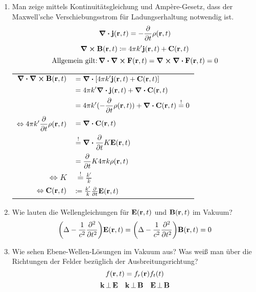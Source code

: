 \documentclass{scrartcl}
\newcommand{\ds}{\displaystyle}
\begin{document}
\begin{enumerate}
    \item Man zeige mittels Kontinuitätsgleichung und Ampère-Gesetz, 
          dass der Maxwell'sche Verschiebungsstrom für Ladungserhaltung
          notwendig ist.
          $$\div \vb j(\vb r, t) = -\pdv{t}\rho(\vb r ,t)$$
          $$\curl\vb B(\vb r, t) \coloneqq 
          4\pi k'\vb j(\vb r ,t) + \vb C(\vb r, t)$$
          $$\text{Allgemein gilt:}\,\div\curl\vb F(\vb r, t)
          =\curl \div \vb F(\vb r, t)=0$$
          \begin{center}
            \begin{tabular}{rl}
            $\ds \div\curl\vb B(\vb r, t)$
                        &$\ds= \div \qty[
                        4\pi k'\vb j(\vb r, t)+\vb C(\vb r, t)]$\\
                        &$\ds= 4\pi k'\div\vb j(\vb r,t) +
                        \div \vb C(\vb r,t)$\\
                        &$\ds= 4\pi k'(-\pdv{t}\rho(\vb r, t)) 
                        +\div \vb C(\vb r,t)\stackrel{!}{=}0$\\
            $\Leftrightarrow\ds 4\pi k'\pdv{t}\rho(\vb r, t)$ 
                        &$\ds =\div \vb 
                        C(\vb r, t)$\footnotemark\\
                        &$\ds \stackrel{!}{=}\div \pdv{t}K\vb E(\vb r, t)$\\
                        &$\ds =\ds \pdv{t} 
                        K4\pi k \rho(\vb r, t)$\\
            $\Leftrightarrow K$         
                        &$\stackrel{!}{=}\frac{k'}{k}$\\
            $\Leftrightarrow \vb C(\vb r,t)$
                        &$\coloneqq \frac{k'}{k}\pdv{t}\vb E(\vb r, t)$
            \end{tabular}
          
          \end{center}

    \item Wie lauten die Wellengleichungen für $\vb E(\vb r, t)$ und
          $\vb B(\vb r, t)$ im Vakuum?
          $$\qty(\Delta - \frac{1}{c^2}\pdv[2]{t})\vb E(\vb r, t)=
          \qty(\Delta - \frac{1}{c^2}\pdv[2]{t})\vb B(\vb r, t)=0$$

    \item Wie sehen Ebene-Wellen-Lösungen im Vakuum aus? Was weiß man
          über die Richtungen der Felder bezüglich der 
          Ausbreitungsrichtung?
          $$f(\vb r , t)=f_r(\vb r)f_t(t)$$
          $$\vb k \,\bot\, \vb E \quad \vb k\,\bot\,\vb B \quad
          \vb E\,\bot\, \vb B$$


\end{enumerate}
\end{document}
